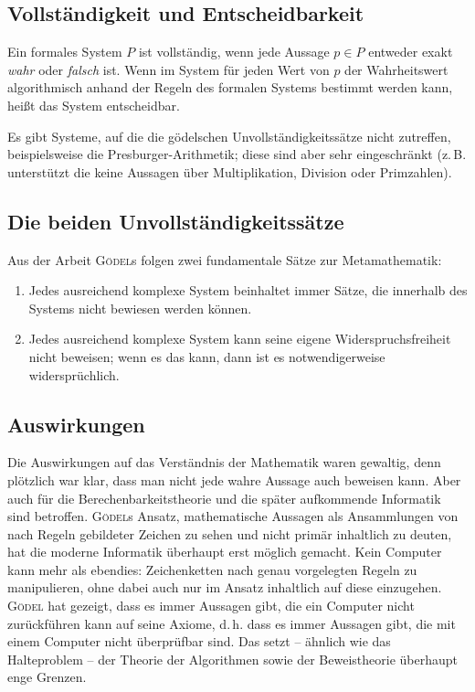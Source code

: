 \subsection*{Vollständigkeit und Entscheidbarkeit}

Ein formales System $P$ ist vollständig, wenn jede Aussage $p \in P$ entweder
exakt \textit{wahr} oder \textit{falsch} ist. Wenn im System für jeden Wert
von $p$ der  Wahrheitswert algorithmisch anhand der Regeln des
formalen Systems bestimmt werden kann, heißt das System \frq entscheidbar\flq.

Es gibt Systeme, auf die die gödelschen Unvollständigkeitssätze nicht zutreffen, beispielsweise die Presburger-Arithmetik;
diese sind aber sehr eingeschränkt
(z.\,B. unterstützt die  keine Aussagen über Multiplikation,
Division oder Primzahlen).

\subsection*{Die beiden Unvollständigkeitssätze}

Aus der Arbeit \textsc{Gödel}s folgen zwei fundamentale Sätze zur Metamathematik:

\begin{enumerate}
	\item Jedes ausreichend komplexe System beinhaltet immer Sätze, die innerhalb
		des Systems nicht bewiesen werden können.
	\item Jedes ausreichend komplexe System kann seine eigene Widerspruchsfreiheit
		nicht beweisen; wenn es das kann, dann ist es
		notwendigerweise widersprüchlich.
\end{enumerate}

\subsection*{Auswirkungen}

Die Auswirkungen auf das Verständnis der Mathematik waren gewaltig, denn plötzlich war klar,
dass man nicht jede wahre Aussage auch beweisen kann. Aber auch für die Berechenbarkeitstheorie
und die später aufkommende Informatik sind betroffen. \textsc{Gödel}s Ansatz, mathematische
Aussagen als Ansammlungen von nach Regeln gebildeter Zeichen zu sehen und nicht primär
inhaltlich zu deuten, hat die moderne Informatik überhaupt erst möglich gemacht.
Kein Computer kann mehr als ebendies: Zeichenketten nach genau vorgelegten Regeln
zu manipulieren, ohne dabei auch nur im Ansatz inhaltlich auf diese einzugehen. \textsc{Gödel} hat
gezeigt, dass es immer Aussagen gibt, die ein Computer nicht zurückführen kann auf
seine Axiome, d.\,h. dass es immer Aussagen gibt, die mit einem Computer nicht überprüfbar sind.
Das setzt -- ähnlich wie das Halteproblem -- der Theorie der Algorithmen sowie
der Beweistheorie überhaupt enge Grenzen.


